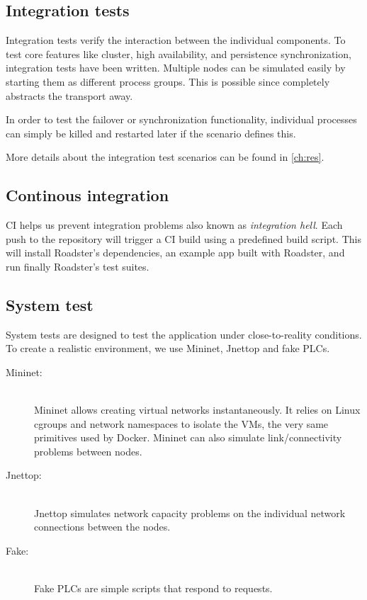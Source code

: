 \subsection{Integration tests}
Integration tests verify the interaction between the individual components.
To test core features like cluster, high availability, and persistence
synchronization, integration tests have been written. Multiple nodes can be
simulated easily by starting them as different process groups. This is possible
since \zmq completely abstracts the transport away.

In order to test the failover or synchronization functionality, individual processes
can simply be killed and restarted later if the scenario defines this.

More details about the integration test scenarios can be found in \autoref{ch:res}.

\subsection{Continous integration}
\gls{CI} helps us prevent integration problems also known as \emph{integration
hell}. Each push to the repository will trigger a CI build using a predefined
build script. This will install Roadster's dependencies, an example app built
with Roadster, and run finally Roadster's test suites.

\subsection{System test}
System tests are designed to test the application under close-to-reality conditions.
To create a realistic environment, we use Mininet, Jnettop and fake \glspl{PLC}.
\begin{description}
	\item [Mininet:]\hfill\\
		Mininet allows creating virtual networks instantaneously. It
		relies on Linux cgroups and network namespaces to isolate the
		\glspl{VM}, the very same primitives used by Docker.
		Mininet can also simulate link/connectivity problems between nodes.
	\item [Jnettop:]\hfill\\
		Jnettop simulates network capacity problems on the individual
		network connections between the nodes. %
	\item [Fake:]\hfill\\
		Fake \glspl{PLC} are simple scripts that respond to requests.
\end{description}


